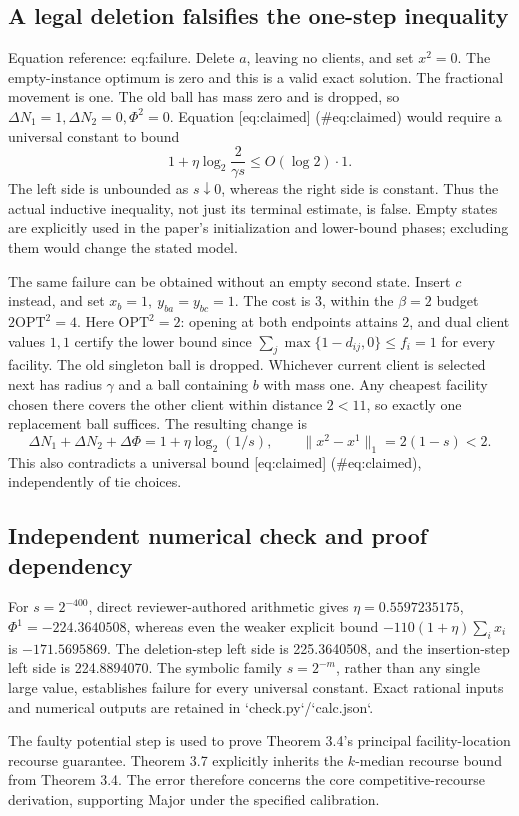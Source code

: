 \documentclass[10pt]{article}
\begin{document}
\subsection*{A legal deletion falsifies the one-step inequality}
Equation reference: eq:failure. Delete \(a\), leaving no clients, and set \(x^2=0\). The empty-instance optimum is zero and this is a valid exact solution. The fractional movement is one. The old ball has mass zero and is dropped, so \(\Delta N_1=1,\Delta N_2=0,\Phi^2=0\). Equation [eq:claimed] (\#eq:claimed) would require a universal constant to bound \[
1+\eta\log_2\frac{2}{\gamma s}
\le O(\log2)\cdot1.\] The left side is unbounded as \(s\downarrow0\), whereas the right side is constant. Thus the actual inductive inequality, not just its terminal estimate, is false. Empty states are explicitly used in the paper’s initialization and lower-bound phases; excluding them would change the stated model.\par
The same failure can be obtained without an empty second state. Insert \(c\) instead, and set \(x_b=1,\ y_{ba}=y_{bc}=1\). The cost is 3, within the \(\beta=2\) budget \(2\mathrm{OPT}^2=4\). Here \(\mathrm{OPT}^2=2\): opening at both endpoints attains 2, and dual client values \(1,1\) certify the lower bound since \(\sum_j\max\{1-d_{ij},0\}\le f_i=1\) for every facility. The old singleton ball is dropped. Whichever current client is selected next has radius \(\gamma\) and a ball containing \(b\) with mass one. Any cheapest facility chosen there covers the other client within distance \(2<11\), so exactly one replacement ball suffices. The resulting change is \[\Delta N_1+\Delta N_2+\Delta\Phi
=1+\eta\log_2(1/s),\qquad
\|x^2-x^1\|_1=2(1-s)<2.\] This also contradicts a universal bound [eq:claimed] (\#eq:claimed), independently of tie choices.\par
\subsection*{Independent numerical check and proof dependency}
For \(s=2^{-400}\), direct reviewer-authored arithmetic gives \(\eta=0.5597235175\), \(\Phi^1=-224.3640508\), whereas even the weaker explicit bound \(-110(1+\eta)\sum_i x_i\) is \(-171.5695869\). The deletion-step left side is 225.3640508, and the insertion-step left side is 224.8894070. The symbolic family \(s=2^{-m}\), rather than any single large value, establishes failure for every universal constant. Exact rational inputs and numerical outputs are retained in `check.py`/`calc.json`.\par
The faulty potential step is used to prove Theorem 3.4’s principal facility-location recourse guarantee. Theorem 3.7 explicitly inherits the \(k\)-median recourse bound from Theorem 3.4. The error therefore concerns the core competitive-recourse derivation, supporting Major under the specified calibration.\par
\end{document}

